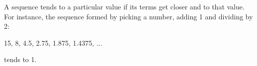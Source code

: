 A sequence tends to a particular value if its terms get closer and
to that value. For instance, the sequence formed by picking a 
number, adding 1 and dividing by 2:
\par
15, 8, 4.5, 2.75, 1.875, 1.4375, ...
\par
tends to 1.